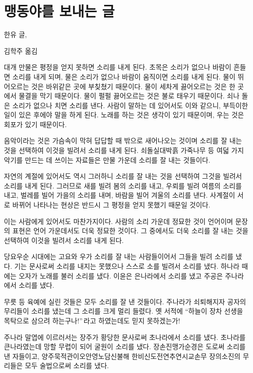 \documentclass[demo,chapter,openany,amsmath,gremph,adjustmath]{xoblivoir}
\begin{document}
\section{맹동야를 보내는 글}
\epigraph{한유 글, }{김학주 옮김}

대개 만물은 평정을 얻지 못하면 소리를 내게 된다.
초목은 소리가 없으나 바람이 흔들면 소리를 내게 되며, 물은 소리가 없으나 바람이
움직이면 소리를 내게 된다. 물이 뛰어오르는 것은 바위같은 곳에 부칮쳤기
때문이다. 물이 세차게 끓어오르는 것은 한 곳에서 물결을 막기 때문이다.
물이 펄펄 끓어오르는 것은 불로 태우기 때문이다. 쇠나 돌은 소리가 없으나
치면 소리를 낸다. 사람이 말하는 데 있어서도 이와 같으니,
부득이한 일이 있은 후에야 말을 하게 된다. 노래를 하는 것은 생각이
있기 때문이며, 우는 것은 회포가 있기 때문이다.

음악이라는 것은 가슴속이 막혀 답답할 때 밖으로 새어나오는 것이며
소리를 잘 내는 것을 선택하여 이것을 빌려서 소리를 내게 된다.
쇠\cntrdot 돌\cntrdot 실\cntrdot 대\cntrdot 박\cntrdot 흙\cntrdot 
가죽\cntrdot 나무 등 여덟 가지 악기를 만드는 데 쓰이는 자료들은 만물
가운데 소리를 잘 내는 것들이다.

자연의 계절에 있어서도 역시 그러하니 소리를 잘 내는 것을 선택하여 그것을
빌려서 소리를 내게 된다. 그러므로 새를 빌려 봄의 소리를 내고, 우뢰를
빌려 여름의 소리를 내고, 벌레를 빌어 가을의 소리를 내며,
바람을 빌어 겨울의 소리를 낸다. 사계절이 서로 바뀌어 나타나는 현상은
반드시 그 평정을 얻지 못했기 때문일 것이다.

이는 사람에게 있어서도 마찬가지이다. 사람의 소리 가운데 정묘한 것이 언어이며
문장의 표현은 언어 가운데서도 더욱 정묘한 것이다. 그 중에서도 더욱 소리를
잘 내는 것을 선택하여 이것을 빌려서 소리를 내게 된다.

당요\cntrdot 우순 시대에는 고요와 우가 소리를 잘 내는 사람들이어서
그들을 빌려 소리를 냈다. 기는 문사로써 소리를 내지는 못했으나
스스로 소를 빌려서 소리를 냈다. 하나라 때에는 오자가 노래를 불러 소리를
냈다. 이윤은 은나라에서 소리를 냈고 주공은 주나라에서 소리를 냈다.

무릇 \cntrdot {} 등 육예에 실린 것들은 모두 소리를
잘 낸 것들이다. 주나라가 쇠퇴해지자 공자의 무리들이 소리를 냈는데
그 소리를 크게 멀리 들렸다. 옛 서적에 ``하늘이 장차 선생을 목탁으로
삼으려 하는구나!''\,라고 하였는데도 믿지 못하겠는가!

주나라 말엽에 이르러서는 장주가 황당한 문사로써 초나라에서
소리를 냈다. 초나라를 큰나라였는데 망할 무렵이 되어 굴원이 소리를 냈다.
장손진\cntrdot 맹가\cntrdot 순경은 도로써 소리를 낸 자들이고,
양주\cntrdot 묵적\cntrdot 관이오\cntrdot 안영\cntrdot 노담\cntrdot 신불해\cntrdot 
한비\cntrdot 신도\cntrdot 전연\cntrdot 추연\cntrdot 시교\cntrdot 손무\cntrdot 
장의\cntrdot 소진의 무리들은 모두 술법으로써 소리를 냈다.
\end{document}
